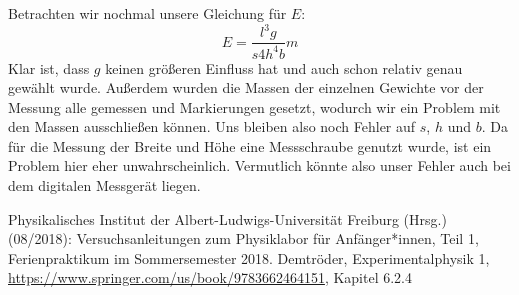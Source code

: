 \documentclass[11pt,a4paper]{article}
\begin{document}
Betrachten wir nochmal unsere Gleichung f\"ur $E$:
\[
E=\frac{l^3g}{s4h^4b}m
\]
Klar ist, dass $g$ keinen gr\"o\ss eren Einfluss hat und auch schon relativ genau gew\"ahlt wurde. Au\ss erdem wurden die Massen der einzelnen Gewichte vor der Messung alle gemessen und Markierungen gesetzt, wodurch wir ein Problem mit den Massen ausschlie\ss en k\"onnen. Uns bleiben also noch Fehler auf $s$, $h$ und $b$. Da f\"ur die Messung der Breite und H\"ohe eine Messschraube genutzt wurde, ist ein Problem hier eher unwahrscheinlich. Vermutlich k\"onnte also unser Fehler auch bei dem digitalen Messger\"at liegen.

\vfill

\begin{thebibliography}{9}
 Physikalisches Institut der Albert-Ludwigs-Universität Freiburg (Hrsg.) (08/2018): Versuchsanleitungen zum Physiklabor für Anfänger*innen, Teil 1, Ferienpraktikum im Sommersemester 2018.
 Demtr\"oder, Experimentalphysik 1, \url{https://www.springer.com/us/book/9783662464151}, Kapitel 6.2.4
\end{thebibliography}




\end{document}
